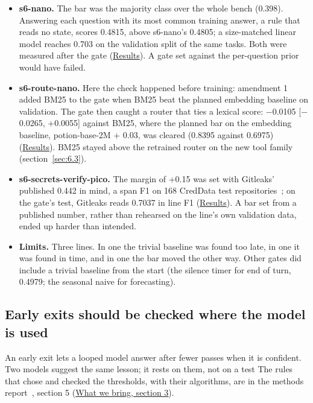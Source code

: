 \documentclass[10pt]{article}
\begin{document}
\begin{itemize}
\item \textbf{s6-nano.} The bar was the majority class over the whole bench (0.398). Answering each question with its most common training answer, a rule that reads no state, scores 0.4815, above s6-nano's 0.4805; a size-matched linear model reaches 0.703 on the validation split of the same tasks. Both were measured after the gate (\href{https://maxgfr.github.io/skycmd/results/\#s6-nano-what-the-gate-did-not-measure}{Results}). A gate set against the per-question prior would have failed.
\item \textbf{s6-route-nano.} Here the check happened before training: amendment 1 added BM25 to the gate when BM25 beat the planned embedding baseline on validation. The gate then caught a router that ties a lexical score: $-$0.0105 [$-$0.0265, +0.0055] against BM25, where the planned bar on the embedding baseline, potion-base-2M + 0.03, was cleared (0.8395 against 0.6975) (\href{https://maxgfr.github.io/skycmd/results/\#s6-route-nano-failed}{Results}). BM25 stayed above the retrained router on the new tool family (section~\ref{sec:6.3}).
\item \textbf{s6-secrets-verify-pico.} The margin of +0.15 was set with Gitleaks' published 0.442 in mind, a span F1 on 168 CredData test repositories~\cite{cbx17m}; on the gate's test, Gitleaks reads 0.7037 in line F1 (\href{https://maxgfr.github.io/skycmd/results/\#s6-secrets-verify-pico-failed}{Results}). A bar set from a published number, rather than rehearsed on the line's own validation data, ended up harder than intended.
\item \textbf{Limits.} Three lines. In one the trivial baseline was found too late, in one it was found in time, and in one the bar moved the other way. Other gates did include a trivial baseline from the start (the silence timer for end of turn, 0.4979; the seasonal naive for forecasting).
\end{itemize}

\subsection{Early exits should be checked where the model is used}\label{sec:5.2}

An early exit lets a looped model answer after fewer passes when it is confident. Two models suggest the same lesson; it rests on them, not on a test The rules that chose and checked the thresholds, with their algorithms, are in the methods report~\cite{golfier2026methods}, section 5 (\href{https://maxgfr.github.io/skycmd/novelty/\#_3-a-lesson-calibrate-early-exits-where-the-model-is-used}{What we bring, section 3}).
\end{document}
